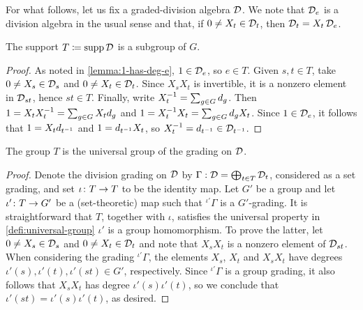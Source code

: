 For what follows, let us fix a graded-division algebra $\mathcal{D}$. 
We note that $\mathcal{D}_e$ is a division algebra in the usual sense and that, if $0\neq X_t \in \mathcal{D}_t$, then $\mathcal{D}_t = X_t \, \mathcal{D}_e$. 

\begin{lemma}
    The support $T \coloneqq \operatorname{supp} \mathcal{D}$ is a subgroup of $G$. 
\end{lemma}

\begin{proof}
    As noted in \cref{lemma:1-has-deg-e}, $1 \in \mathcal{D}_e$, so $e \in T$. 
    Given $s,t \in T$, take $0 \neq X_s \in \mathcal{D}_s$ and $0 \neq X_t \in \mathcal{D}_t$. 
    Since $X_s X_t$ is invertible, it is a nonzero element in $\mathcal{D}_{st}$, hence $st \in T$. 
    Finally, write $X_t^{-1} =  \sum_{g\in G} d_g$. 
    Then $1 = X_t X_t^{-1} = \sum_{g\in G} X_t d_g$ and $1 = X_t^{-1} X_t = \sum_{g\in G} d_g X_t$. 
    Since $1 \in \mathcal{D}_e$, it follows that $1 = X_t d_{t^{-1}}$ and $1 = d_{t^{-1}} X_t$, so $X_t^{-1} = d_{t^{-1}} \in \mathcal{D}_{t^{-1}}$. 
\end{proof}



    
    

\begin{lemma}\label{lemma:div-grd-unvrsl-grp}
    The group $T$ is the universal group of the grading on $\mathcal{D}$. 
\end{lemma}

\begin{proof}
    Denote the division grading on $\mathcal{D}$ by $\Gamma : \mathcal{D} = \bigoplus_{t\in T} \mathcal{D}_t$,  considered as a set grading, and set $\iota\colon T \to T$ to be the identity map. 
    Let $G'$ be a group and let $\iota'\colon T \to G'$ be a (set-theoretic) map such that ${}^{\iota'}\Gamma$ is a $G'$-grading. 
    It is straightforward that $T$, together with $\iota$, satisfies the universal property in \cref{defi:universal-group} \IFF $\iota'$ is a group homomorphism. 
    To prove the latter, let $0 \neq X_s \in \mathcal{D}_s$ and $0 \neq X_t \in \mathcal{D}_t$ and note that $X_s X_t$ is a nonzero element of $\mathcal{D}_{st}$.  
    When considering the grading ${}^{\iota'}\Gamma$, the elements $X_s$, $X_t$ and $X_s X_t$ have degrees $\iota'(s), \iota'(t),\iota'(st) \in G'$, respectively. 
    Since ${}^{\iota'}\Gamma$ is a group grading, it also follows that $X_s X_t$ has degree $\iota'(s) \iota'(t)$, so we conclude that $\iota'(st) = \iota'(s) \iota'(t)$, as desired. 
\end{proof}

